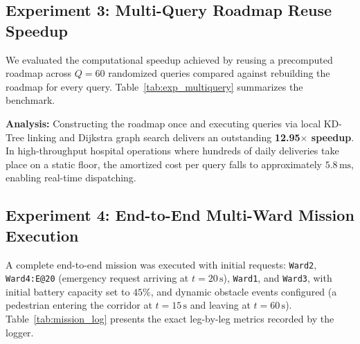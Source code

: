 \documentclass[12pt,a4paper]{article}
\begin{document}
\subsection{Experiment 3: Multi-Query Roadmap Reuse Speedup}
We evaluated the computational speedup achieved by reusing a precomputed roadmap across $Q = 60$ randomized queries compared against rebuilding the roadmap for every query. Table~\ref{tab:exp_multiquery} summarizes the benchmark.

\begin{table}[H]
\centering
\caption{Empirical Multi-Query Computational Speedup Evaluation ($Q = 60$ Queries)}
\label{tab:exp_multiquery}
\end{table}

\textbf{Analysis:} Constructing the roadmap once and executing queries via local KD-Tree linking and Dijkstra graph search delivers an outstanding \textbf{12.95$\times$ speedup}. In high-throughput hospital operations where hundreds of daily deliveries take place on a static floor, the amortized cost per query falls to approximately $5.8\,\text{ms}$, enabling real-time dispatching.

\clearpage
\subsection{Experiment 4: End-to-End Multi-Ward Mission Execution}
A complete end-to-end mission was executed with initial requests: \texttt{Ward2}, \texttt{Ward4:E@20} (emergency request arriving at $t=20\,\text{s}$), \texttt{Ward1}, and \texttt{Ward3}, with initial battery capacity set to $45\%$, and dynamic obstacle events configured (a pedestrian entering the corridor at $t=15\,\text{s}$ and leaving at $t=60\,\text{s}$). Table~\ref{tab:mission_log} presents the exact leg-by-leg metrics recorded by the logger.
\end{document}
